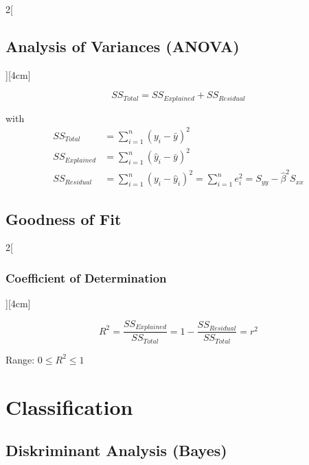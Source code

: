 \documentclass[8pt]{extarticle}
\begin{document}
\begin{multicols}{2}[\subsection{Analysis of Variances (ANOVA)}][4cm]

$$SS_{Total}=SS_{Explained}+SS_{Residual}$$

with
\begin{align*}
SS_{Total}  &=  \sum\limits_{i=1}^n(y_i-\bar{y})^2 \\
SS_{Explained} &= \sum\limits_{i=1}^n(\hat{y}_i-\bar{y})^2 \\
SS_{Residual} &= \sum\limits_{i=1}^n(y_i-\hat{y}_i)^2=\sum\limits_{i=1}^n e_i^2=S_{yy}-\hat{\beta}^2S_{xx} 
\end{align*}

\end{multicols}

\subsection{Goodness of Fit}

\begin{multicols}{2}[\subsubsection{Coefficient of Determination}][4cm]

$$R^2=\frac{SS_{Explained}}{SS_{Total}}=1-\frac{SS_{Residual}}{SS_{Total}}=r^2$$

Range: $0 \le R^2 \le 1$

\end{multicols}




\section{Classification}

\subsection{Diskriminant Analysis (Bayes)}


\end{document}

